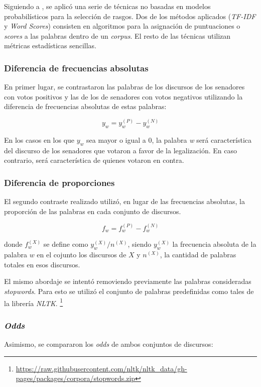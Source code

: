 Siguiendo a \cite{monroe2008fightin}, se aplicó una serie de técnicas
no basadas en modelos probabilísticos para la selección de rasgos.
Dos de los métodos aplicados (\textit{TF-IDF} y \textit{Word Scores}) consisten
en algoritmos para la asignación de puntuaciones o \textit{scores} a las
palabras dentro de un \textit{corpus}. El resto de las técnicas utilizan
métricas estadísticas sencillas.

\subsubsection{Diferencia de frecuencias absolutas}
En primer lugar, se contrastaron las palabras de los discursos de los
senadores con votos positivos y las de los de senadores con votos negativos
utilizando la diferencia de frecuencias absolutas de estas palabras:

\begin{equation*}
y_w = y_{w}^{(P)}-y_{w}^{(N)}
\end{equation*}

En los casos en los que $y_{w}$ sea mayor o igual a $0$, la palabra
\textit{w} será característica del discurso de los senadores que votaron a
favor de la legalización. En caso contrario, será característica de quienes
votaron en contra.

\subsubsection{Diferencia de proporciones}
El segundo contraste realizado utilizó, en lugar de las frecuencias absolutas,
la proporción de las palabras en cada conjunto de discursos.

\begin{equation*}
    f_w = f_{w}^{(P)}-f_{w}^{(N)}
\end{equation*}


donde $f_{w}^{(X)}$ se define como $y_{w}^{(X)} / n^{(X)}$, siendo $y_{w}^{(X)}$
la frecuencia absoluta de la palabra $w$ en el cojunto los discursos de $X$
y $n^{(X)}$, la cantidad de palabras totales en esos discursos.

El mismo abordaje se intentó removiendo previamente las palabras consideradas
\textit{stopwords}. Para esto se utilizó el conjunto de palabras predefinidas
como tales de la librería \textit{NLTK}.
\footnote{\url{https://raw.githubusercontent.com/nltk/nltk_data/gh-pages/packages/corpora/stopwords.zip}}

\subsubsection{\textit{Odds}}
Asimismo, se compararon los \textit{odds} de ambos conjuntos de discursos:


